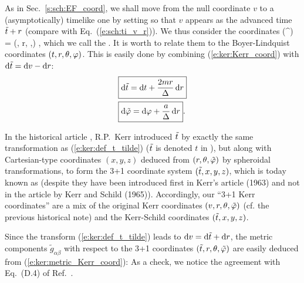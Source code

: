 As in Sec.~\ref{s:sch:EF_coord},
we shall move from the null coordinate $v$ to a (asymptotically)
timelike one by setting
\be \label{e:ker:def_t_tilde}
     \iff {}
\ee
so that $v$ appears as the advanced time ${\tilde t}+r$ (compare with Eq.~(\ref{e:sch:ti_v_r})). We thus consider
the coordinates
\be
    (^\alpha) = (\ti, r, \th,\tph) ,
\ee
which we call the
.
It is worth to relate them to the Boyer-Lindquist coordinates
$(t,r,\theta,\varphi)$. This is easily done
by combining (\ref{e:ker:Kerr_coord}) with $\mathrm{d}{\tilde t} = \mathrm{d} v - \mathrm{d} r$:
\begin{subequations}
\label{e:ker:Kerr_3p1_BL}
\begin{align}
& \fbox{$\displaystyle \mathrm{d} {\tilde t} = \mathrm{d} t + \frac{2m r}{\Delta} \, \mathrm{d} r$} \\
& \fbox{$\displaystyle \mathrm{d} {\tilde\varphi} = \mathrm{d} \varphi + \frac{a}{\Delta}\, \mathrm{d} r$} .
\end{align}
\end{subequations}


\begin{hist}
In the historical article \cite{Kerr63}, R.P.~Kerr introduced ${\tilde t}$ by exactly
the same transformation as (\ref{e:ker:def_t_tilde}) (${\tilde t}$ is denoted $t$
in \cite{Kerr63}), but along with Cartesian-type coordinates $(x,y,z)$
deduced from $(r,\theta,{\tilde\varphi})$ by spheroidal transformations, to form the 3+1
coordinate system $({\tilde t},x,y,z)$, which is today known as
 (despite
they have been introduced first in Kerr's article \cite{Kerr63} (1963) and not
in the article by Kerr and Schild \cite{KerrS65} (1965)). Accordingly,
our ``3+1 Kerr coordinates'' are a mix of the original Kerr coordinates
$(v,r,\theta,{\tilde\varphi})$ (cf. the previous historical note)
and the Kerr-Schild coordinates $({\tilde t},x,y,z)$.
\end{hist}

Since the transform (\ref{e:ker:def_t_tilde}) leads to $\mathrm{d} v = \mathrm{d}{\tilde t} + \mathrm{d} r$,
the metric components $\tilde{g}_{\alpha\beta}$ with respect to the
3+1 coordinates $({\tilde t},r,\theta,{\tilde\varphi})$ are easily deduced from
(\ref{e:ker:metric_Kerr_coord}):
\be \label{e:ker:metric_Kerr_3p1}
\ee
As a check, we notice the agreement with Eq.~(D.4) of Ref.~\cite{GourgJ06}.


